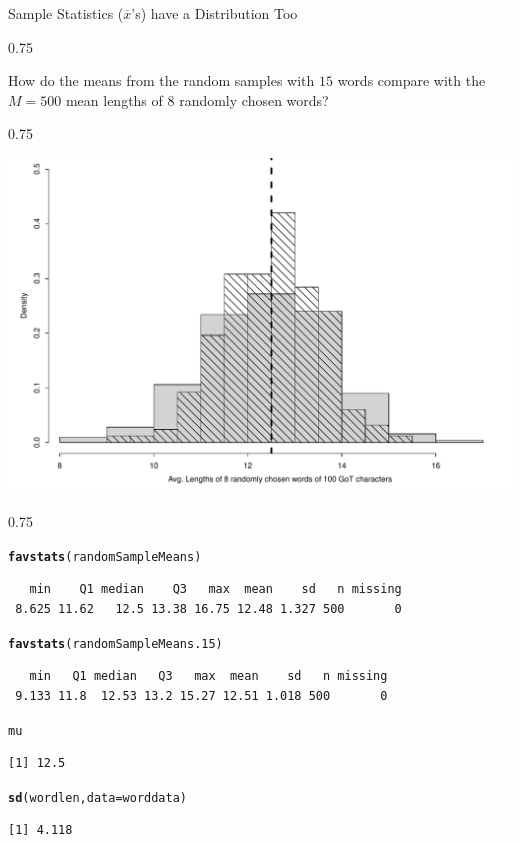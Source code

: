 \documentclass{beamer}\usepackage[]{graphicx}\usepackage[]{color}
\makeatletter
\newcommand{\hlstd}[1]{\textcolor[rgb]{0.102,0.102,0.102}{#1}}%
\newcommand{\hlkwc}[1]{\textcolor[rgb]{0.2,0.2,0.2}{#1}}%
\newcommand{\hlkwd}[1]{\textcolor[rgb]{0.102,0.102,0.102}{\textbf{#1}}}%
\newenvironment{kframe}{%
 \def\at@end@of@kframe{}%
 \ifinner\ifhmode%
  \def\at@end@of@kframe{\end{minipage}}%
  \begin{minipage}{\columnwidth}%
 \fi\fi%
 \def\FrameCommand##1{\hskip\@totalleftmargin \hskip-\fboxsep
 \colorbox{shadecolor}{##1}\hskip-\fboxsep
     \hskip-\linewidth \hskip-\@totalleftmargin \hskip\columnwidth}%
 \MakeFramed {\advance\hsize-\width
   \@totalleftmargin\z@ \linewidth\hsize
   \@setminipage}}%
 {\par\unskip\endMakeFramed%
 \at@end@of@kframe}
\newenvironment{knitrout}{}{} %
\renewenvironment{knitrout}{\begin{spacing}{0.75}\begin{tiny}}{\end{tiny}\end{spacing}}
\newcommand{\xbar}{\overline{x}}
\makeatother
\begin{document}
\begin{frame}{Sample Statistics ($\xbar$'s) have a Distribution Too\;\;}
\begin{knitrout}
{}



\end{knitrout}

\newpage

How do the means from the random samples with $15$ words compare
with the $M=500$ mean lengths of $8$ randomly chosen words?
\begin{knitrout}\small
{}\color{fgcolor}

{\centering \includegraphics[width=0.79\linewidth]{figure/graphics-unnamed-chunk-48-1} 

}



\end{knitrout}

\newpage

\begin{knitrout}\small
{}\color{fgcolor}\begin{kframe}
\begin{alltt}
\hlkwd{favstats}\hlstd{(randomSampleMeans)}
\end{alltt}
\begin{verbatim}
   min    Q1 median    Q3   max  mean    sd   n missing
 8.625 11.62   12.5 13.38 16.75 12.48 1.327 500       0
\end{verbatim}
\begin{alltt}
\hlkwd{favstats}\hlstd{(randomSampleMeans.15)}
\end{alltt}
\begin{verbatim}
   min   Q1 median   Q3   max  mean    sd   n missing
 9.133 11.8  12.53 13.2 15.27 12.51 1.018 500       0
\end{verbatim}
\begin{alltt}
\hlstd{mu}
\end{alltt}
\begin{verbatim}
[1] 12.5
\end{verbatim}
\begin{alltt}
\hlkwd{sd}\hlstd{(wordlen,} \hlkwc{data}\hlstd{=worddata)}
\end{alltt}
\begin{verbatim}
[1] 4.118
\end{verbatim}
\end{kframe}
\end{knitrout}



\end{frame}
\end{document}
